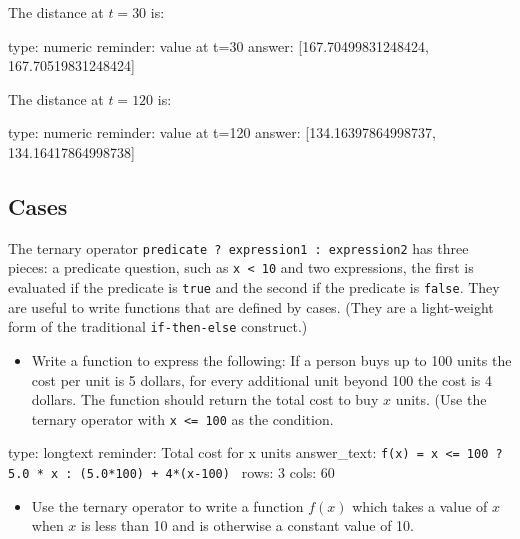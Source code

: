 \documentclass[12pt]{article}
\begin{document}
The distance at $t=30$ is:

\begin{answer}
    type: numeric
    reminder: value at t=30
    answer: [167.70499831248424, 167.70519831248424]

\end{answer}

The distance at $t=120$ is:

\begin{answer}
    type: numeric
    reminder: value at t=120
    answer: [134.16397864998737, 134.16417864998738]

\end{answer}

\subsection{Cases}

The ternary operator \texttt{predicate ? expression1 : expression2} has
three pieces: a predicate question, such as \texttt{x \textless{} 10}
and two expressions, the first is evaluated if the predicate is
\texttt{true} and the second if the predicate is \texttt{false}. They
are useful to write functions that are defined by cases. (They are a
light-weight form of the traditional \texttt{if-then-else} construct.)

\begin{itemize}
\itemsep1pt\parskip0pt
\item
  Write a function to express the following: If a person buys up to 100
  units the cost per unit is 5 dollars, for every additional unit beyond
  100 the cost is 4 dollars. The function should return the total cost
  to buy $x$ units. (Use the ternary operator with
  \texttt{x \textless{}=   100} as the condition.
\end{itemize}

\begin{answer}
type: longtext
reminder: Total cost for x units
answer_text: \verb#f(x) = x <= 100 ? 5.0 * x : (5.0*100) + 4*(x-100) # 
rows: 3
cols: 60
\end{answer}

\begin{itemize}
\itemsep1pt\parskip0pt
\item
  Use the ternary operator to write a function $f(x)$ which takes a
  value of $x$ when $x$ is less than 10 and is otherwise a constant
  value of 10.
\end{itemize}
\end{document}

